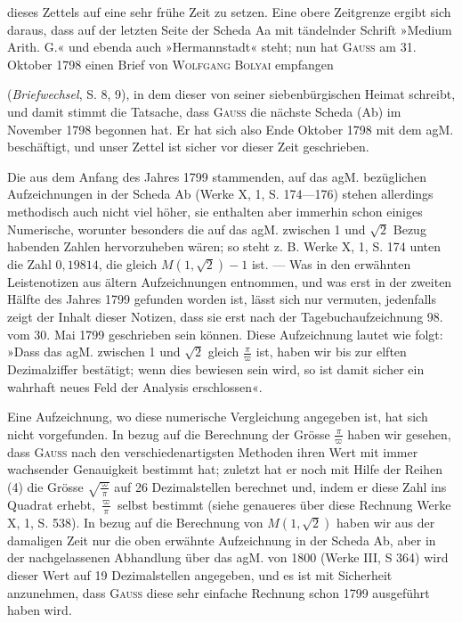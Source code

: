 dieses Zettels auf eine sehr frühe Zeit zu setzen. Eine obere Zeitgrenze ergibt
sich daraus, dass auf der letzten Seite der Scheda Aa mit tändelnder
Schrift »Medium Arith. G.« und ebenda auch »Hermannstadt« steht; nun hat
\textsc{Gauss} am 31. Oktober 1798 einen Brief von \textsc{Wolfgang Bolyai} empfangen\par
\clearpage{}
\noindent (\textit{Briefwechsel}, S. 8, 9), in dem dieser von seiner siebenbürgischen Heimat
schreibt, und damit stimmt die Tatsache, dass \textsc{Gauss} die nächste Scheda (Ab)
im November 1798 begonnen hat. Er hat sich also Ende Oktober 1798 mit
dem agM. beschäftigt, und unser Zettel ist sicher vor dieser Zeit geschrieben.

Die aus dem Anfang des Jahres 1799 stammenden, auf das agM. bezüglichen
Aufzeichnungen in der Scheda Ab (Werke X, 1, S. 174—176) stehen
allerdings methodisch auch nicht viel höher, sie enthalten aber immerhin
schon einiges Numerische, worunter besonders die auf das agM. zwischen 1
und \(\sqrt2\) Bezug habenden Zahlen hervorzuheben wären; so steht z. B. Werke
X, 1, S. 174 unten die Zahl \(0{,}19814\), die gleich \(M(1,\sqrt2)-1\) ist. — Was in
den erwähnten Leistenotizen aus ältern Aufzeichnungen entnommen, und was
erst in der zweiten Hälfte des Jahres 1799 gefunden worden ist, lässt sich
nur vermuten, jedenfalls zeigt der Inhalt dieser Notizen, dass sie erst nach
der Tagebuchaufzeichnung 98. vom 30. Mai 1799 geschrieben sein können.
Diese Aufzeichnung lautet wie folgt: »Dass das agM. zwischen 1 und \(\sqrt2\) gleich
\(\frac{\pi}{\varpi}\) ist, haben wir bis zur elften Dezimalziffer bestätigt; wenn dies bewiesen
sein wird, so ist damit sicher ein wahrhaft neues Feld der Analysis erschlossen«.

Eine Aufzeichnung, wo diese numerische Vergleichung angegeben ist, hat
sich nicht vorgefunden. In bezug auf die Berechnung der Grösse \(\frac{\pi}{\varpi}\) haben
wir gesehen, dass \textsc{Gauss} nach den verschiedenartigsten Methoden ihren Wert
mit immer wachsender Genauigkeit bestimmt hat; zuletzt hat er noch mit
Hilfe der Reihen (4) die Grösse \(\sqrt{\frac{\varpi}{\pi}}\) auf 26 Dezimalstellen berechnet und,
indem er diese Zahl ins Quadrat erhebt, \(\frac{\varpi}{\pi}\) selbst bestimmt (siehe genaueres
über diese Rechnung Werke X, 1, S. 538). In bezug auf die Berechnung von
\(M(1,\sqrt2)\) haben wir aus der damaligen Zeit nur die oben erwähnte Aufzeichnung
in der Scheda Ab, aber in der nachgelassenen Abhandlung über das
agM. von 1800 (Werke III, S 364) wird dieser Wert auf 19 Dezimalstellen
angegeben, und es ist mit Sicherheit anzunehmen, dass \textsc{Gauss} diese sehr einfache
Rechnung schon 1799 ausgeführt haben wird.

